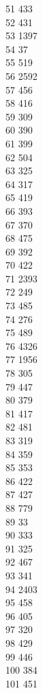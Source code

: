 { 51	433 \\
 52	431 \\
 53	1397 \\
 54	37 \\
 55	519 \\
 56	2592 \\
 57	456 \\
 58	416 \\
 59	309 \\
 60	390 \\
 61	399 \\
 62	504 \\
 63	325 \\
 64	317 \\
 65	419 \\
 66	393 \\
 67	370 \\
 68	475 \\
 69	392 \\
 70	422 \\
 71	2393 \\
 72	249 \\
 73	485 \\
 74	276 \\
 75	489 \\
 76	4326 \\
 77	1956 \\
 78	305 \\
 79	447 \\
 80	379 \\
 81	417 \\
 82	481 \\
 83	319 \\
 84	359 \\
 85	353 \\
 86	422 \\
 87	427 \\
 88	779 \\
 89	33 \\
 90	333 \\
 91	325 \\
 92	467 \\
 93	341 \\
 94	2403 \\
 95	458 \\
 96	405 \\
 97	320 \\
 98	429 \\
 99	446 \\
 100	384 \\
 101	451 \\
}
